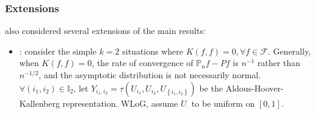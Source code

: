 \documentclass[twoside]{article}
\begin{document}
\subsubsection{Extensions}
\citet{davezies2021empirical} also considered several extensions of the main results:
\begin{itemize}
    \item {}: consider the simple $k=2$ situations where $K(f,f)=0, \forall f\in\mathcal{F}$. 
    Generally, when $K(f,f)=0$, the rate of convergence of $\mathbb{P}_nf -Pf$ is $n^{-1}$ rather than $n^{-1/2}$, and the asymptotic distribution is not necessarily normal. $\forall (i_1,i_2)\in\mathbb{I}_2$, let $Y_{i_1,i_2}=\tau\left( U_{i_1},U_{i_2},U_{\left\{i_1,i_2\right\}} \right)$ be the Aldous-Hoover-Kallenberg representation. WLoG, assume $U_{\cdot}$ to be uniform on $[0,1]$.
    

\end{itemize}
\end{document}
